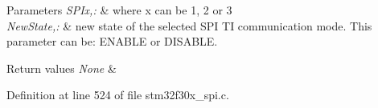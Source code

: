 \begin{DoxyParams}{Parameters}
{\em S\-P\-Ix,\-:} & where x can be 1, 2 or 3 \\
\hline
{\em New\-State,\-:} & new state of the selected S\-P\-I T\-I communication mode. This parameter can be\-: E\-N\-A\-B\-L\-E or D\-I\-S\-A\-B\-L\-E. \\
\hline
\end{DoxyParams}

\begin{DoxyRetVals}{Return values}
{\em None} & \\
\hline
\end{DoxyRetVals}


Definition at line 524 of file stm32f30x\-\_\-spi.\-c.

